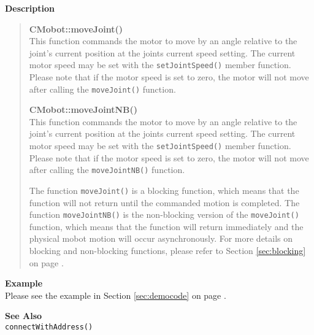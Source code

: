 \noindent
{\bf Description}\\
\vspace{-12pt}
\begin{quote}
{\bf CMobot::moveJoint()}\\
This function commands the motor to move by an angle relative to the
joint's current position at the joints current speed setting.
The current motor speed may be set with the
\texttt{setJointSpeed()} member function. Please note that if the motor speed
is set to zero, the motor will not move after calling the
\texttt{moveJoint()} function. 

{\bf CMobot::moveJointNB()}\\
This function commands the motor to move by an angle relative to the
joint's current position at the joints current speed setting.
The current motor speed may be set with the
\texttt{setJointSpeed()} member function. Please note that if the motor speed
is set to zero, the motor will not move after calling the
\texttt{moveJointNB()} function. 

The function \texttt{moveJoint()} is a blocking function, which means that 
the function will not return until the commanded motion is 
completed. The function \texttt{moveJointNB()} is the non-blocking version of
the \texttt{moveJoint()} function, which means that the function will return
immediately and the physical mobot motion will occur asynchronously. For
more details on blocking and non-blocking functions, please refer to 
Section \ref{sec:blocking} on page \pageref{sec:blocking}.\\
\end{quote}

\noindent
{\bf Example}\\
Please see the example in Section \ref{sec:democode} on page \pageref{sec:democode}.\\
\noindent

\noindent
{\bf See Also}\\
\texttt{connectWithAddress()}

